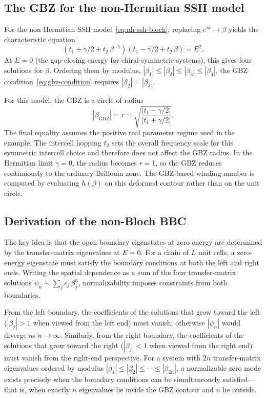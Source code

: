 \subsection{The GBZ for the non-Hermitian SSH model}
\label{ssec:gbz-ssh}

For the non-Hermitian SSH model~\eqref{eq:nh-ssh-bloch}, replacing
$e^{ik} \to \beta$ yields the characteristic equation
\begin{equation}
 (t_1 + \gamma/2 + t_2\,\beta^{-1})(t_1 - \gamma/2 + t_2\,\beta) = E^2.
 \label{eq:nh-ssh-char}
\end{equation}
At $E = 0$ (the gap-closing energy for chiral-symmetric systems), this
gives four solutions for $\beta$. Ordering them by modulus,
$|\beta_1| \le |\beta_2| \le |\beta_3| \le |\beta_4|$, the GBZ
condition~\eqref{eq:gbz-condition} requires $|\beta_2| = |\beta_3|$.

For this model, the GBZ is a circle of radius
\begin{equation}
  |\beta_{\mathrm{GBZ}}| = r
  = \sqrt{\frac{|t_1 - \gamma/2|}{|t_1 + \gamma/2|}}.
  \label{eq:gbz-radius-ssh}
\end{equation}
The final equality assumes the positive real parameter regime used in the
example.  The intercell hopping $t_2$ sets the overall frequency
scale for this symmetric intercell choice and therefore does not affect
the GBZ radius.  In the Hermitian limit $\gamma=0$, the radius becomes
$r=1$, so the GBZ reduces continuously to the ordinary Brillouin zone.
The GBZ-based winding number is computed by evaluating $h(\beta)$ on this
deformed contour rather than on the unit circle.

\subsection{Derivation of the non-Bloch BBC}
\label{ssec:bbc-derivation}

The key idea is that the open-boundary eigenstates at zero energy are
determined by the transfer-matrix eigenvalues at $E = 0$. For a chain
of $L$ unit cells, a zero-energy eigenstate must satisfy the boundary
conditions at both the left and right ends. Writing the spatial
dependence as a sum of the four transfer-matrix solutions
$\psi_n \sim \sum_j c_j\,\beta_j^n$, normalizability imposes constraints
from both boundaries.

From the left boundary, the coefficients of the solutions that grow
toward the left ($|\beta_j| > 1$ when viewed from the left end) must
vanish; otherwise $|\psi_n|$ would diverge as $n \to \infty$.
Similarly, from the right boundary, the coefficients of the solutions
that grow toward the right ($|\beta_j| < 1$ when viewed from the right
end) must vanish from the right-end perspective. For a system with
$2n$ transfer-matrix eigenvalues ordered by modulus
$|\beta_1| \le |\beta_2| \le \cdots \le |\beta_{2n}|$, a normalizable
zero mode exists precisely when the boundary conditions can be
simultaneously satisfied---that is, when exactly $n$ eigenvalues lie
inside the GBZ contour and $n$ lie outside.

